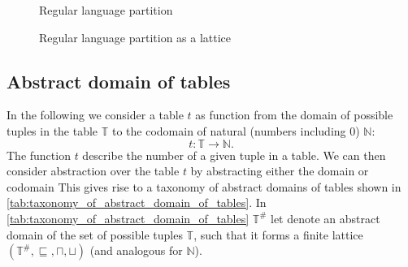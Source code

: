 \begin{figure}
    \center
    \caption{Regular language partition}
    \label{fig:tikz-reg-partition}
\end{figure}


\begin{figure}[!htb]
    \center
    \caption{Regular language partition as a lattice}
    \label{fig:tikz-reg-partition-lattice}
\end{figure}

\subsection{Abstract domain of tables}\label{sec:abstract_domain_of_tables}

In the following we consider a table $t$ as function from the domain of possible tuples in the table $\mathbb{T}$ to the codomain of natural (numbers including $0$) $\mathbb{N}$:
\begin{equation}
    t : \mathbb{T} \rightarrow \mathbb{N}.
\end{equation}
The function $t$ describe the number of a given tuple in a table.
We can then consider abstraction over the table $t$ by abstracting either the domain or codomain
This gives rise to a taxonomy of abstract domains of tables shown in \autoref{tab:taxonomy_of_abstract_domain_of_tables}.
In \autoref{tab:taxonomy_of_abstract_domain_of_tables} $\mathbb{T}^\#$ let denote an abstract domain of the set of possible tuples $\mathbb{T}$, such that it forms a finite lattice $(\mathbb{T}^\#, \sqsubseteq, \sqcap, \sqcup)$ (and analogous for $\mathbb{N}$).

